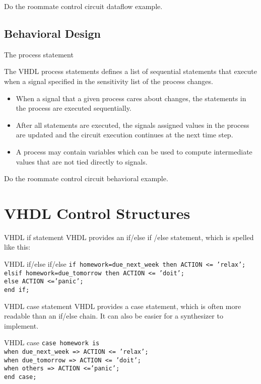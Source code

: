 Do the roommate control circuit dataflow example.

\subsection{Behavioral Design}

\begin{frame}{The process statement}
  \begin{definition}
    The VHDL \alert{process} statements defines a list of sequential statements that execute when a signal specified in the \alert{sensitivity list} of the process changes.
  \end{definition}
  \begin{itemize}
    \item When a signal that a given process cares about changes, the statements in the process are executed sequentially.
    \item After all statements are executed, the signals assigned values in the process are updated and the circuit execution continues at the next time step.
    \item A process may contain \alert{variables} which can be used to compute intermediate values that are not tied directly to signals.
  \end{itemize}
\end{frame}

Do the roommate control circuit behavioral example.

\section{VHDL Control Structures}

\begin{frame}{VHDL if statement}
  VHDL provides an if/else if /else statement, which is spelled like this:
  \begin{block}{VHDL if/else if/else}
    \texttt{if homework=due\_next\_week then ACTION <= 'relax';\\elsif homework=due\_tomorrow then ACTION <= 'doit';\\else ACTION <='panic';\\end if;}
  \end{block}
\end{frame}

\begin{frame}{VHDL case statement}
  VHDL provides a case statement, which is often more readable than an if/else chain.  It can also be easier for a synthesizer to implement.
  \begin{block}{VHDL case}
    \texttt{case homework is\\ \hspace{24pt} when due\_next\_week => ACTION <= 'relax';\\ \hspace{24pt} when due\_tomorrow => ACTION <= 'doit';\\ \hspace{24pt} when others => ACTION <='panic';\\end case;}
  \end{block}
\end{frame}

